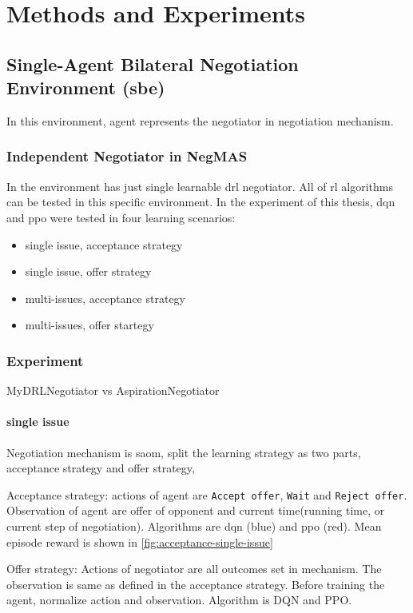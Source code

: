 \chapter{Methods and Experiments}

\section{Single-Agent Bilateral Negotiation Environment (\gls{sbe})}
In this environment, agent represents the negotiator in negotiation mechanism.

\subsection{Independent Negotiator in NegMAS}
In the environment has just single learnable \gls{drl} negotiator. All of \gls{rl} algorithms can be tested in this specific environment. In the experiment of this thesis, \gls{dqn} and \gls{ppo} were tested in four learning scenarios:
\begin{itemize}
	\item single issue, acceptance strategy
	\item single issue, offer strategy
	\item multi-issues, acceptance strategy
	\item multi-issues, offer startegy
\end{itemize}

\subsection{Experiment}
MyDRLNegotiator vs AspirationNegotiator
\subsubsection{single issue}
Negotiation mechanism is \gls{saom}, split the learning strategy as two parts, acceptance strategy and offer strategy, 

Acceptance strategy: actions of agent are \texttt{Accept offer}, \texttt{Wait} and \texttt{Reject offer}. Observation of agent are offer of opponent and current time(running time, or current step of negotiation). Algorithms are \gls{dqn} (blue) and \gls{ppo} (red). Mean episode reward is shown in \ref{fig:acceptance-single-issue}

Offer strategy: Actions of negotiator are all outcomes set in mechanism. The observation is same as defined in the acceptance strategy. Before training the agent, normalize action and observation. Algorithm is DQN and PPO.

